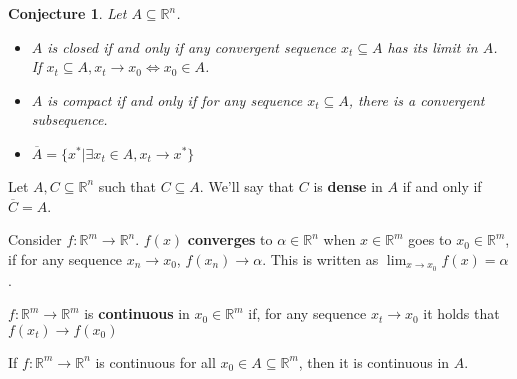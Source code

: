 \documentclass[aspectratio=169, handout]{beamer}
\newtheorem{proposition}{Conjecture}[section]
\begin{document}
\begin{frame}

\begin{proposition}
    Let $A\subseteq\mathds{R}^n$.
    \begin{itemize}
        \item $A$ is closed if and only if any convergent sequence $x_t\subseteq A$ has its limit in $A$. If $x_t\subseteq A, x_t\rightarrow x_0\Leftrightarrow x_0\in A$.
        \item $A$ is compact if and only if for any sequence $x_t\subseteq A$, there is a convergent subsequence.
        \item $\overline{A}=\{x^*|\exists x_t\in A, x_t\rightarrow x^*\}$
    \end{itemize}
\end{proposition}
    
\end{frame}

\begin{frame}
    \begin{definition}
    Let $A,C\subseteq \mathds{R}^n$ such that $C\subseteq A$. We'll say that $C$ is \textbf{dense} in $A$ if and only if $\overline{C}=A$.
    \end{definition}
    
\end{frame}

\begin{frame}

    \begin{definition}
    Consider $f:\mathds{R}^m\rightarrow\mathds{R}^n$. $f(x)$ \textbf{converges} to $\alpha \in \mathds{R}^n$ when $x\in\mathds{R}^m$ goes to $x_0\in\mathds{R}^m$, if for any sequence $x_n\rightarrow x_0$, $f(x_n)\rightarrow \alpha$. This is written as $\lim_{x\rightarrow x_0} f(x)=\alpha$.
    \end{definition}
    
    \begin{definition}
    $f:\mathds{R}^m\rightarrow\mathds{R}^m$ is \textbf{continuous} in $x_0\in\mathds{R}^m$ if, for any sequence $x_t\rightarrow x_0$ it holds that $f(x_t)\rightarrow f(x_0)$
    \end{definition}
    
    \begin{definition}
     If $f:\mathds{R}^m\rightarrow \mathds{R}^n$ is continuous for all $x_0\in A\subseteq \mathds{R}^m$, then it is continuous in $A$.
    \end{definition}
\end{frame}
\end{document}
